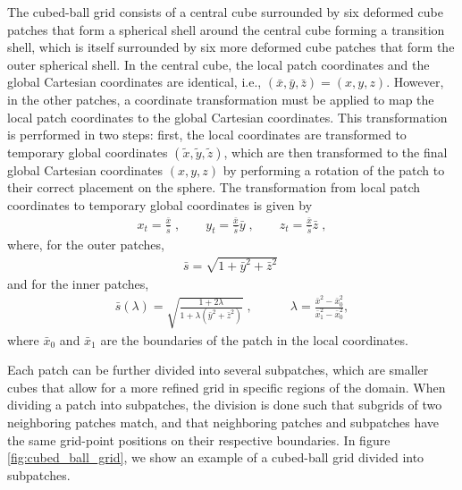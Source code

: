 The cubed-ball grid consists of a central cube surrounded by six deformed cube patches that form a spherical shell around the central cube forming a transition shell, which is itself surrounded by six more deformed cube patches that form the outer spherical shell. In the central cube, the local patch coordinates and the global Cartesian coordinates are identical, i.e., $(\bar{x},\bar{y},\bar{z}) = (x,y,z)$. However, in the other patches, a coordinate transformation must be applied to map the local patch coordinates to the global Cartesian coordinates. This transformation is perrformed in two steps: first, the local coordinates are transformed to temporary global coordinates $(\tilde{x},\tilde{y},\tilde{z})$, which are then transformed to the final global Cartesian coordinates $(x,y,z)$ by performing a rotation of the patch to their correct placement on the sphere. The transformation from local patch coordinates to temporary global coordinates is given by
%
\begin{align}
    x_t = \frac{\bar{x}}{\bar{s}} \; , \quad \quad y_t = \frac{\bar{x}}{\bar{s}} \bar{y} \; ,  \quad \quad z_t = \frac{\bar{x}}{\bar{s}} \bar{z} \; ,
\end{align}
%
where, for the outer patches,
%
\begin{align}
    \bar{s} = \sqrt{1 + \bar{y}^2 + \bar{z}^2} \; 
\end{align}
%
and for the inner patches,
%
\begin{align}
    \bar{s}(\lambda) = \sqrt{\frac{1 + 2\lambda}{1 + \lambda (\bar{y}^2 + \bar{z}^2)}} \; , \quad \quad \quad \lambda = \frac{\bar{x}^2 - \bar{x}_0^2}{\bar{x}_1^2 - \bar{x}_0^2} ,
\end{align}
%
where $\bar{x}_0$ and $\bar{x}_1$ are the boundaries of the patch in the local coordinates.

Each patch can be further divided into several subpatches, which are smaller cubes that allow for a more refined grid in specific regions of the domain. When dividing a patch into subpatches, the division is done such that subgrids of two neighboring patches match, and that neighboring patches and subpatches have the same grid-point positions on their respective boundaries. In figure \ref{fig:cubed_ball_grid}, we show an example of a cubed-ball grid divided into subpatches.

